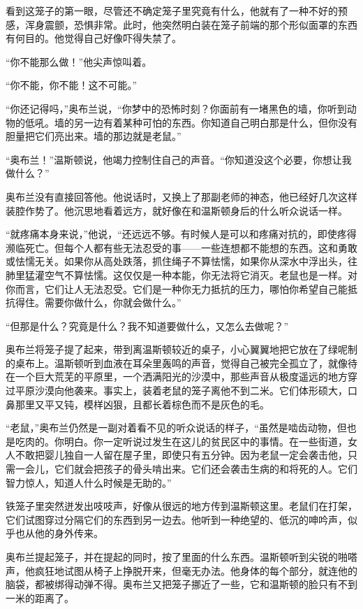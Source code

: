 看到这笼子的第一眼，尽管还不确定笼子里究竟有什么，他就有了一种不好的预感，浑身震颤，恐惧非常。此时，他突然明白装在笼子前端的那个形似面罩的东西有何目的。他觉得自己好像吓得失禁了。

``你不能那么做！''他尖声惊叫着。

``你不能，你不能！这不可能。''

``你还记得吗，''奥布兰说，``你梦中的恐怖时刻？你面前有一堵黑色的墙，你听到动物的低吼。墙的另一边有着某种可怕的东西。你知道自己明白那是什么，但你没有胆量把它们亮出来。墙的那边就是老鼠。''

``奥布兰！''温斯顿说，他竭力控制住自己的声音。``你知道没这个必要，你想让我做什么？''

奥布兰没有直接回答他。他说话时，又换上了那副老师的神态，他已经好几次这样装腔作势了。他沉思地看着远方，就好像在和温斯顿身后的什么听众说话一样。

``就疼痛本身来说，''他说，``还远远不够。有时候人是可以和疼痛对抗的，即使疼得濒临死亡。但每个人都有些无法忍受的事——一些连想都不能想的东西。这和勇敢或怯懦无关。如果你从高处跌落，抓住绳子不算怯懦，如果你从深水中浮出头，往肺里猛灌空气不算怯懦。这仅仅是一种本能，你无法将它消灭。老鼠也是一样。对你而言，它们让人无法忍受。它们是一种你无力抵抗的压力，哪怕你希望自己能抵抗得住。需要你做什么，你就会做什么。''

``但那是什么？究竟是什么？我不知道要做什么，又怎么去做呢？''

奥布兰将笼子提了起来，带到离温斯顿较近的桌子，小心翼翼地把它放在了绿呢制的桌布上。温斯顿听到血液在耳朵里轰鸣的声音，觉得自己被完全孤立了，就像待在一个巨大荒芜的平原里，一个洒满阳光的沙漠中，那些声音从极度遥远的地方穿过平原沙漠向他袭来。事实上，装着老鼠的笼子离他不到二米。它们体形硕大，口鼻那里又平又钝，模样凶狠，且都长着棕色而不是灰色的毛。

``老鼠，''奥布兰仍然是一副对着看不见的听众说话的样子，``虽然是啮齿动物，但也是吃肉的。你明白。你一定听说过发生在这儿的贫民区中的事情。在一些街道，女人不敢把婴儿独自一人留在屋子里，即使只有五分钟。因为老鼠一定会袭击他，只需一会儿，它们就会把孩子的骨头啃出来。它们还会袭击生病的和将死的人。它们智力惊人，知道人什么时候是无助的。''

铁笼子里突然迸发出吱吱声，好像从很远的地方传到温斯顿这里。老鼠们在打架，它们试图穿过分隔它们的东西到另一边去。他听到一种绝望的、低沉的呻吟声，似乎也从他的身外传来。

奥布兰提起笼子，并在提起的同时，按了里面的什么东西。温斯顿听到尖锐的啪嗒声，他疯狂地试图从椅子上挣脱开来，但毫无办法。他身体的每个部分，就连他的脑袋，都被绑得动弹不得。奥布兰又把笼子挪近了一些，它和温斯顿的脸只有不到一米的距离了。


